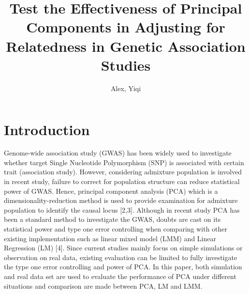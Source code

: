 \documentclass[12pt]{article}
\title{Test the Effectiveness of Principal Components in Adjusting for Relatedness in Genetic Association Studies}
\author{Alex, Yiqi }
\begin{document}
	\maketitle
	
	
\section{Introduction} 

Genome-wide association study (GWAS) has been widely used to investigate whether target Single Nucleotide Polymorphism (SNP) is associated with certain trait (association study). However, considering admixture population is involved in recent study, failure to correct for population structure can reduce statistical power of GWAS. Hence, principal component analysis (PCA) which is a dimensionality-reduction method is used to provide examination for admixture population to identify the causal locus [2,3]. Although in recent study PCA has been a standard method to investigate the GWAS, doubts are cast on its statistical power and type one error controlling when comparing with other existing implementation such as linear mixed model (LMM) and Linear Regression (LM) [4]. Since current studies mainly focus on simple simulations or observation on real data, existing evaluation can be limited to fully investigate the type one error controlling and power of PCA. In this paper, both simulation and real data set are used to evaluate the performance of PCA under different situations and comparison are made between PCA, LM and LMM.\\
\end{document}
